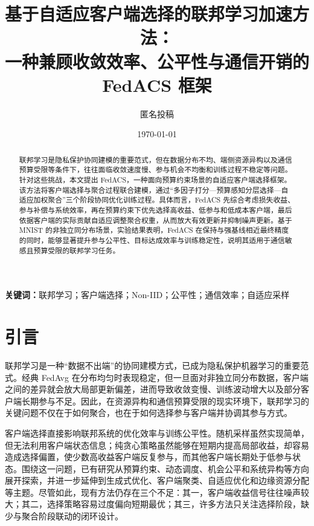 \documentclass[UTF8,11pt]{ctexart}
\title{基于自适应客户端选择的联邦学习加速方法：\\
一种兼顾收敛效率、公平性与通信开销的 FedACS 框架}
\author{匿名投稿}
\date{\today}
\begin{document}
\pagestyle{plain}
\maketitle

\begin{abstract}
联邦学习是隐私保护协同建模的重要范式，但在数据分布不均、端侧资源异构以及通信预算受限等条件下，往往面临收敛速度慢、参与机会不均衡和训练过程不稳定等问题。针对这些挑战，本文提出 FedACS，一种面向预算约束场景的自适应客户端选择框架。该方法将客户端选择与聚合过程联合建模，通过“多因子打分—预算感知分层选择—自适应加权聚合”三个阶段协同优化训练过程。具体而言，FedACS 先综合考虑损失收益、参与补偿与系统效率，再在预算约束下优先选择高收益、低参与和低成本客户端，最后依据客户端的实际贡献自适应调整聚合权重，从而放大有效更新并抑制噪声更新。基于 MNIST 的非独立同分布场景，实验结果表明，FedACS 在保持与强基线相近最终精度的同时，能够显著提升参与公平性、目标达成效率与训练稳定性，说明其适用于通信敏感且预算受限的联邦学习任务。
\end{abstract}

\noindent\textbf{关键词：}联邦学习；客户端选择；Non-IID；公平性；通信效率；自适应采样

\section{引言}
联邦学习是一种“数据不出端”的协同建模方式，已成为隐私保护机器学习的重要范式\cite{mcmahan2017communication}。经典 FedAvg 在分布均匀时表现稳定，但一旦面对非独立同分布数据，客户端之间的差异就会放大局部更新偏差，进而导致收敛变慢、训练波动增大以及部分客户端长期参与不足\cite{zhao2018federated,hsu2019measuring}。因此，在资源异构和通信预算受限的现实环境下，联邦学习的关键问题不仅在于如何聚合，也在于如何选择参与客户端并协调其参与方式。

客户端选择直接影响联邦系统的优化效率与训练公平性。随机采样虽然实现简单，但无法利用客户端状态信息；纯贪心策略虽然能够在短期内提高局部收益，却容易造成选择偏置，使少数高收益客户端反复参与，而其他客户端长期处于低参与状态\cite{fu2023client,marfo2025efficient,perazzone2024communication}。围绕这一问题，已有研究从预算约束、动态调度、机会公平和系统异构等方向展开探索\cite{fu2023client,mao2024federated,shi2023towards,huang2024federated,li2024adafl,wang2025resource}，并进一步延伸到生成式优化、客户端聚类、自适应优化和边缘资源分配等主题\cite{chen2024gradient,zeng2024fedclust,lee2025efficient,wang2024fedgma}。尽管如此，现有方法仍存在三个不足：其一，客户端收益信号往往噪声较大；其二，选择策略容易过度偏向短期最优；其三，许多方法只关注选择阶段，缺少与聚合阶段联动的闭环设计。
\end{document}
